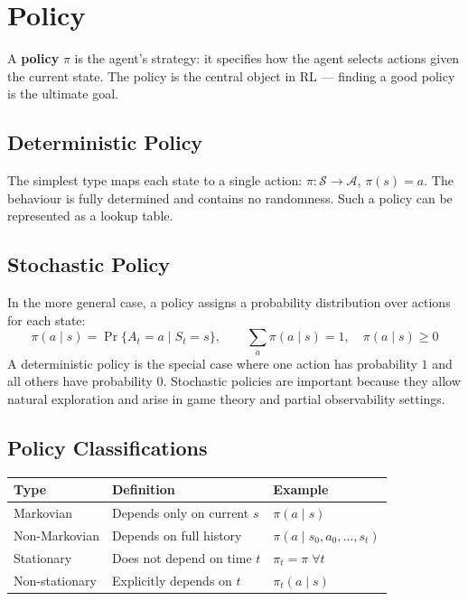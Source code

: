 \documentclass[11pt,a4paper]{article}
\newcommand{\term}[1]{\textcolor{DefGreen}{\textbf{#1}}}
\begin{document}
\section{Policy}

A \term{policy} $\pi$ is the agent's strategy: it specifies how the agent selects actions given the current state. The policy is the central object in RL --- finding a good policy is the ultimate goal.

\subsection{Deterministic Policy}

The simplest type maps each state to a single action: $\pi : \mathcal{S} \to \mathcal{A}$, $\pi(s) = a$. The behaviour is fully determined and contains no randomness. Such a policy can be represented as a lookup table.

\subsection{Stochastic Policy}

In the more general case, a policy assigns a probability distribution over actions for each state:
\[
\pi(a \mid s) = \Pr\{A_t = a \mid S_t = s\}, \qquad \sum_{a} \pi(a \mid s) = 1, \quad \pi(a\mid s) \geq 0
\]
A deterministic policy is the special case where one action has probability $1$ and all others have probability $0$. Stochastic policies are important because they allow natural exploration and arise in game theory and partial observability settings.

\subsection{Policy Classifications}

\begin{tcolorbox}[colback=LightBlue,colframe=AccentBlue,boxrule=0.8pt,arc=3pt]
\begin{tabular}{@{}lp{5.5cm}p{5cm}@{}}
\toprule
\textbf{Type} & \textbf{Definition} & \textbf{Example} \\
\midrule
Markovian & Depends only on current $s$ & $\pi(a \mid s)$ \\
Non-Markovian & Depends on full history & $\pi(a \mid s_0,a_0,\ldots,s_t)$ \\
Stationary & Does not depend on time $t$ & $\pi_t = \pi\;\forall t$ \\
Non-stationary & Explicitly depends on $t$ & $\pi_t(a \mid s)$ \\
\bottomrule
\end{tabular}
\end{tcolorbox}
\end{document}
